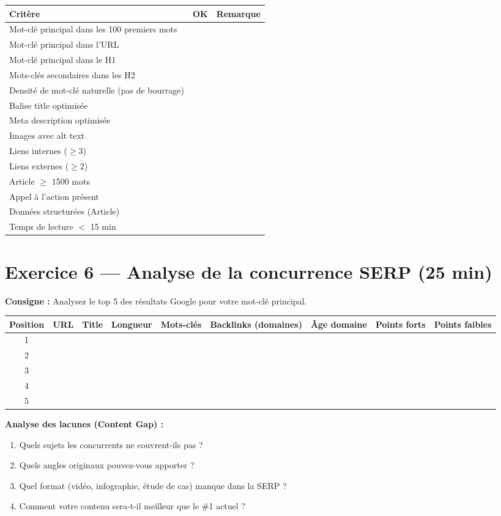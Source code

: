 \documentclass[12pt,a4paper]{report}
\begin{document}
\begin{tabular}{|l|c|l|}
\hline
\textbf{Critère} & \textbf{OK} & \textbf{Remarque} \\
\hline
Mot-clé principal dans les 100 premiers mots & & \\
\hline
Mot-clé principal dans l'URL & & \\
\hline
Mot-clé principal dans le H1 & & \\
\hline
Mots-clés secondaires dans les H2 & & \\
\hline
Densité de mot-clé naturelle (pas de bourrage) & & \\
\hline
Balise title optimisée & & \\
\hline
Meta description optimisée & & \\
\hline
Images avec alt text & & \\
\hline
Liens internes ($\ge$3) & & \\
\hline
Liens externes ($\ge$2) & & \\
\hline
Article $\ge$ 1500 mots & & \\
\hline
Appel à l'action présent & & \\
\hline
Données structurées (Article) & & \\
\hline
Temps de lecture $<$ 15 min & & \\
\hline
\end{tabular}

\section{Exercice 6 --- Analyse de la concurrence SERP (25 min)}

\textbf{Consigne :} Analysez le top 5 des résultats Google pour votre mot-clé principal.

\begin{longtable}{|c|l|l|c|c|c|c|l|l|}
\hline
\textbf{Position} & \textbf{URL} & \textbf{Title} & \textbf{Longueur} & \textbf{Mots-clés} & \textbf{Backlinks (domaines)} & \textbf{Âge domaine} & \textbf{Points forts} & \textbf{Points faibles} \\
\hline
1 & & & & & & & & \\
\hline
2 & & & & & & & & \\
\hline
3 & & & & & & & & \\
\hline
4 & & & & & & & & \\
\hline
5 & & & & & & & & \\
\hline
\end{longtable}

\textbf{Analyse des lacunes (Content Gap) :}
\begin{enumerate}
\item Quels sujets les concurrents ne couvrent-ils pas ?
\item Quels angles originaux pouvez-vous apporter ?
\item Quel format (vidéo, infographie, étude de cas) manque dans la SERP ?
\item Comment votre contenu sera-t-il meilleur que le \#1 actuel ?
\end{enumerate}
\end{document}
